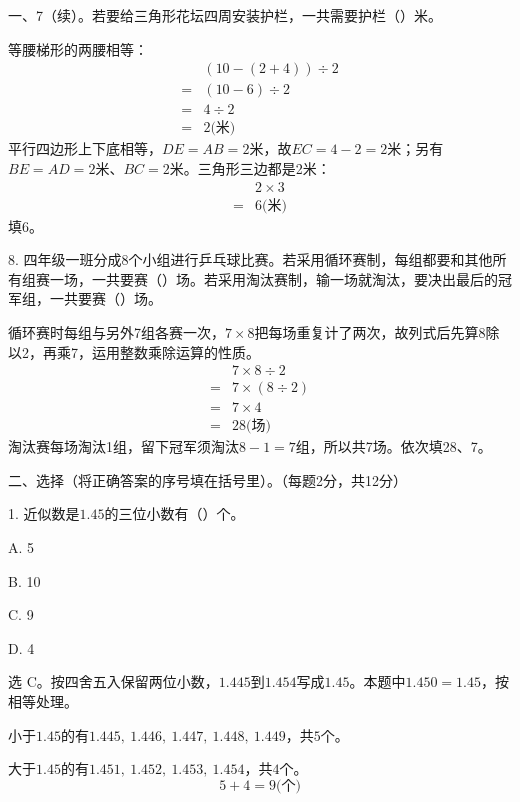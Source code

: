 一、7（续）。若要给三角形花坛四周安装护栏，一共需要护栏（\hspace{1.8em}）米。\par
{}
\begin{BookAnswer}
等腰梯形的两腰相等：\[\begin{aligned} &(10-(2+4))\div2\\ ={}&(10-6)\div2\\ ={}&4\div2\\ ={}&2\text{(米)}\end{aligned}\]平行四边形上下底相等，\allowbreak{}\(DE=AB=2\)米，故\(EC=4-2=2\)米；另有\(BE=AD=2\)米、\(BC=2\)米。三角形三边都是2米：\[\begin{aligned} &2\times3\\ ={}&6\text{(米)}\end{aligned}\]填6。
\end{BookAnswer}

8. 四年级一班分成\(8\)个小组进行乒乓球比赛。若采用循环赛制，每组都要和其他所有组赛一场，一共要赛（\hspace{1.8em}）场。若采用淘汰赛制，输一场就淘汰，要决出最后的冠军组，一共要赛（\hspace{1.8em}）场。\par
{}
\begin{BookAnswer}
循环赛时每组与另外7组各赛一次，\allowbreak{}\(7\times8\)把每场重复计了两次，故列式后先算8除以2，再乘7，运用整数乘除运算的性质。\[\begin{aligned}&7\times8\div2\\={}&7\times(8\div2)\\={}&7\times4\\={}&28\text{(场)}\end{aligned}\]淘汰赛每场淘汰1组，留下冠军须淘汰\(8-1=7\)组，所以共7场。依次填28、7。
\end{BookAnswer}

二、选择（将正确答案的序号填在括号里）。（每题2分，共12分）\par 1. 近似数是\(1.45\)的三位小数有（\hspace{1.8em}）个。\par
\noindent A. 5\par
\noindent B. 10\par
\noindent C. 9\par
\noindent D. 4\par
\begin{BookAnswer}
选 C。按四舍五入保留两位小数，\allowbreak{}\(1.445\)到\(1.454\)写成\(1.45\)。本题中\(1.450=1.45\)，按相等处理。\par
小于\(1.45\)的有\(1.445,\ 1.446,\ 1.447,\ 1.448,\ 1.449\)，共\(5\)个。\par
大于\(1.45\)的有\(1.451,\ 1.452,\ 1.453,\ 1.454\)，共\(4\)个。
\[
5+4=9\text{(个)}
\]
\end{BookAnswer}

